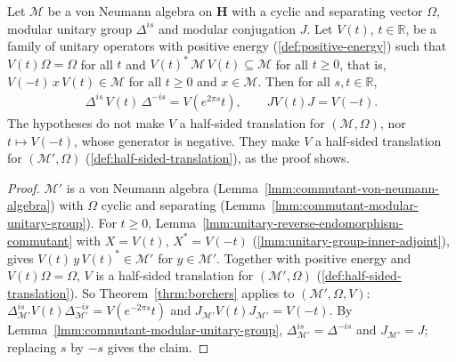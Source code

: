 \begin{corollary}
    \label{crllr:borchers-reversed}
    \leanok
    Let $\mathcal{M}$ be a von Neumann algebra on $\mathbf{H}$ with a cyclic and separating vector $\Omega$, modular unitary group $\Delta^{is}$ and modular conjugation $J$. Let $V(t)$, $t \in \mathbb{R}$, be a family of unitary operators with positive energy (\ref{def:positive-energy}) such that $V(t)\Omega = \Omega$ for all $t$ and $V(t)^*\,\mathcal{M}\,V(t) \subseteq \mathcal{M}$ for all $t \ge 0$, that is, $V(-t)\,x\,V(t) \in \mathcal{M}$ for all $t \ge 0$ and $x \in \mathcal{M}$. Then for all $s, t \in \mathbb{R}$,
    \begin{align}
        \Delta^{is}\,V(t)\,\Delta^{-is} = V(e^{2\pi s}t), \qquad JV(t)J = V(-t).
    \end{align}
    The hypotheses do not make $V$ a half-sided translation for $(\mathcal{M}, \Omega)$, nor $t \mapsto V(-t)$, whose generator is negative. They make $V$ a half-sided translation for $(\mathcal{M}', \Omega)$ (\ref{def:half-sided-translation}), as the proof shows.
\end{corollary}
\begin{proof}
    \leanok
    $\mathcal{M}'$ is a von Neumann algebra (Lemma~\ref{lmm:commutant-von-neumann-algebra}) with $\Omega$ cyclic and separating (Lemma~\ref{lmm:commutant-modular-unitary-group}). For $t \ge 0$, Lemma~\ref{lmm:unitary-reverse-endomorphism-commutant} with $X = V(t)$, $X^* = V(-t)$ (\ref{lmm:unitary-group-inner-adjoint}), gives $V(t)\,y\,V(t)^* \in \mathcal{M}'$ for $y \in \mathcal{M}'$. Together with positive energy and $V(t)\Omega = \Omega$, $V$ is a half-sided translation for $(\mathcal{M}', \Omega)$ (\ref{def:half-sided-translation}). So Theorem~\ref{thrm:borchers} applies to $(\mathcal{M}', \Omega, V)$: $\Delta_{\mathcal{M}'}^{is}V(t)\Delta_{\mathcal{M}'}^{-is} = V(e^{-2\pi s}t)$ and $J_{\mathcal{M}'}V(t)J_{\mathcal{M}'} = V(-t)$. By Lemma~\ref{lmm:commutant-modular-unitary-group}, $\Delta_{\mathcal{M}'}^{is} = \Delta^{-is}$ and $J_{\mathcal{M}'} = J$; replacing $s$ by $-s$ gives the claim.
\end{proof}

